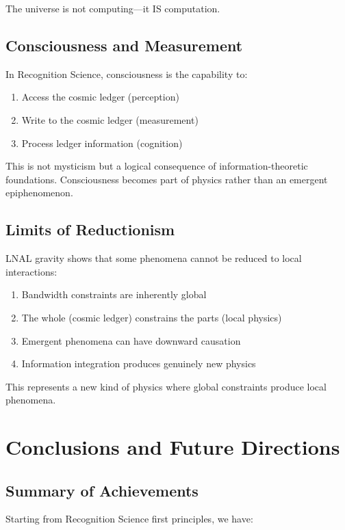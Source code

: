 \documentclass[12pt,letterpaper]{article}
\begin{document}
The universe is not computing---it IS computation.

\subsection{Consciousness and Measurement}

In Recognition Science, consciousness is the capability to:
\begin{enumerate}
\item Access the cosmic ledger (perception)
\item Write to the cosmic ledger (measurement)
\item Process ledger information (cognition)
\end{enumerate}

This is not mysticism but a logical consequence of information-theoretic foundations. Consciousness becomes part of physics rather than an emergent epiphenomenon.

\subsection{Limits of Reductionism}

LNAL gravity shows that some phenomena cannot be reduced to local interactions:

\begin{enumerate}
\item Bandwidth constraints are inherently global
\item The whole (cosmic ledger) constrains the parts (local physics)
\item Emergent phenomena can have downward causation
\item Information integration produces genuinely new physics
\end{enumerate}

This represents a new kind of physics where global constraints produce local phenomena.

\section{Conclusions and Future Directions}
\label{sec:conclusions}

\subsection{Summary of Achievements}

Starting from Recognition Science first principles, we have:
\end{document}
